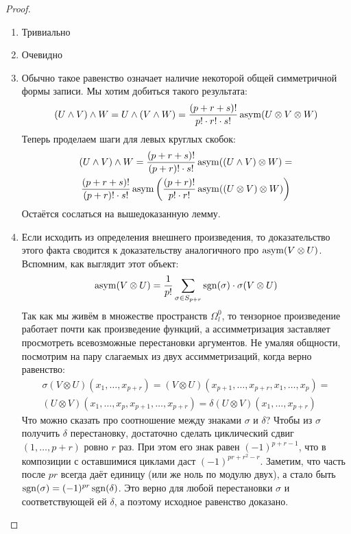 \begin{proof}~
	\begin{enumerate}
		\item Тривиально
		
		\item Очевидно
		
		\item Обычно такое равенство означает наличие некоторой общей симметричной формы записи. Мы хотим добиться такого результата:
		\[
		(U \wedge V) \wedge W = U \wedge (V \wedge W) = \frac{(p + r + s)!}{p! \cdot r! \cdot s!} \operatorname{asym}(U \otimes V \otimes W)
		\]
		Теперь проделаем шаги для левых круглых скобок:
		\begin{multline*}
		(U \wedge V) \wedge W = \frac{(p + r + s)!}{(p + r)! \cdot s!} \operatorname{asym}((U \wedge V) \otimes W) =
		\\
		\frac{(p + r + s)!}{(p + r)! \cdot s!} \operatorname{asym}\left(\frac{(p + r)!}{p! \cdot r!} \operatorname{asym}((U \otimes V) \otimes W)\right)
		\end{multline*}
		Остаётся сослаться на вышедоказанную лемму.
		
		\item Если исходить из определения внешнего произведения, то доказательство этого факта сводится к доказательству аналогичного про $\operatorname{asym}(V \otimes U)$. Вспомним, как выглядит этот объект:
		\[
		\operatorname{asym}(V \otimes U) = \frac{1}{p!} \sum_{\sigma \in S_{p + r}} \operatorname{sgn}(\sigma) \cdot \sigma (V \otimes U)
		\]
		Так как мы живём в множестве пространств $\Omega_l^0$, то тензорное произведение работает почти как произведение функций, а ассимметризация заставляет просмотреть всевозможные перестановки аргументов. Не умаляя общности, посмотрим на пару слагаемых из двух ассимметризаций, когда верно равенство:
		\begin{multline*}
		\sigma(V \otimes U)(x_1, \ldots, x_{p + r}) = (V \otimes U)(x_{p + 1}, \ldots, x_{p + r}, x_1, \ldots, x_p) =
		\\
		(U \otimes V)(x_1, \ldots, x_p, x_{p + 1}, \ldots, x_{p + r}) = \delta(U \otimes V)(x_1, \ldots, x_{p + r})
		\end{multline*}
		Что можно сказать про соотношение между знаками $\sigma$ и $\delta$? Чтобы из $\sigma$ получить $\delta$ перестановку, достаточно сделать циклический сдвиг $(1, \ldots, p + r)$ ровно $r$ раз. При этом его знак равен $(-1)^{p + r - 1}$, что в композиции с оставшимися циклами даст $(-1)^{pr + r^2 - r}$. Заметим, что часть после $pr$ всегда даёт единицу (или же ноль по модулю двух), а стало быть $\operatorname{sgn}(\sigma) = (-1)^{pr} \operatorname{sgn}(\delta)$. Это верно для любой перестановки $\sigma$ и соответствующей ей $\delta$, а поэтому исходное равенство доказано.
	\end{enumerate}
\end{proof}

